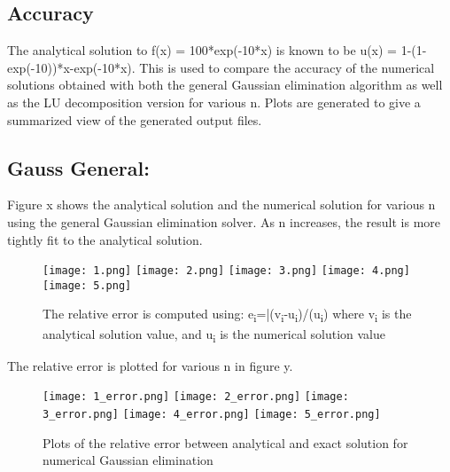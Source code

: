 \documentclass[12pt]{article}
\begin{document}
\subsection{Accuracy}
The analytical solution to f(x) = 100*exp(-10*x) is known to be u(x) = 1-(1-exp(-10))*x-exp(-10*x). This is used to compare the accuracy of the numerical solutions obtained with both the general Gaussian elimination algorithm as well as the LU decomposition version for various n.  Plots are generated to give a summarized view of the generated output files.\\

\subsection{Gauss General:}
Figure x shows the analytical solution and the numerical solution for various n using the general Gaussian elimination solver. As n increases, the result is more tightly fit to the analytical solution.\\

\begin{figure}[H]
\graphicspath{{~/GitHub/sayboltm/PHY480/Project1/Report/Precision/Gauss/} {c:/Users/charl/Documents/Precision/Gauss/}{C:/Users/Mike/Documents/GitHub/sayboltm/PHY480/Project1/Report/Precision/Gauss/}}
\texttt{[image: 1.png]}
\texttt{[image: 2.png]}
\texttt{[image: 3.png]}
\texttt{[image: 4.png]}
\centering
\texttt{[image: 5.png]}\\
\centering
\caption{The relative error is computed using:
	e\textsubscript{i}=|(v\textsubscript{i}-u\textsubscript{i})/(u\textsubscript{i})
	where v\textsubscript{i} is the analytical solution value, and u\textsubscript{i} is the numerical solution value}
\end{figure}
The relative error is plotted for various n in figure y.\\
\begin{figure}[H]
\centering
\graphicspath{{~/GitHub/sayboltm/PHY480/Project1/Report/Precision/Gauss/} {c:/Users/charl/Documents/Precision/Gauss/}{C:/Users/Mike/Documents/GitHub/sayboltm/PHY480/Project1/Report/Precision/Gauss/}}
\texttt{[image: 1\_error.png]}
\texttt{[image: 2\_error.png]}
\texttt{[image: 3\_error.png]}
\texttt{[image: 4\_error.png]}
\centering
\texttt{[image: 5\_error.png]}\\
\centering
\caption{ Plots of the relative error between analytical and exact solution for numerical Gaussian elimination}
\end{figure}
\end{document}
